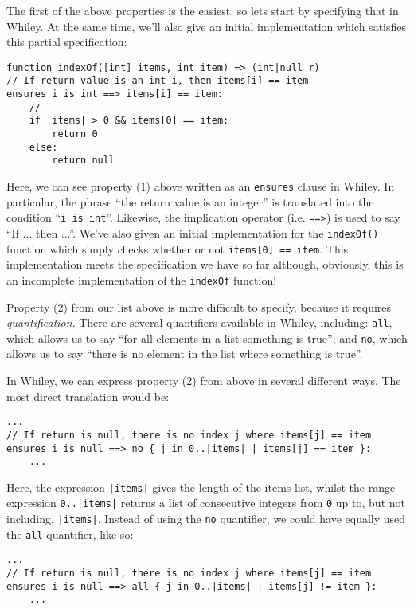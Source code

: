 The first of the above properties is the easiest, so lets start by
specifying that in Whiley.  At the same time, we'll also give an
initial implementation which satisfies this partial specification:

\begin{lstlisting}
function indexOf([int] items, int item) => (int|null r)
// If return value is an int i, then items[i] == item
ensures i is int ==> items[i] == item:
    //
    if |items| > 0 && items[0] == item:
        return 0
    else:
        return null
\end{lstlisting}

Here, we can see property (1) above written as an \lstinline{ensures}
clause in Whiley.  In particular, the phrase ``the return value is an
integer'' is translated into the condition ``\lstinline{i is int}''.
Likewise, the implication operator (i.e. \lstinline{==>}) is used to
say ``If ... then ...''.  We've also given an initial implementation
for the \lstinline{indexOf()} function which simply checks whether or
not \lstinline{items[0] == item}.  This implementation meets the
specification we have so far although, obviously, this is an
incomplete implementation of the \lstinline{indexOf} function!

Property (2) from our list above is more difficult to specify, because
it requires {\em quantification}.  There are several quantifiers
available in Whiley, including: \lstinline{all}, which allows us to
say ``for all elements in a list something is true''; and
\lstinline{no}, which allows us to say ``there is no element in the list
where something is true''. 

In Whiley, we can express property (2) from above in several different
ways.  The most direct translation would be:

\begin{lstlisting}
...
// If return is null, there is no index j where items[j] == item
ensures i is null ==> no { j in 0..|items| | items[j] == item }:
    ...
\end{lstlisting}

\noindent Here, the expression \lstinline{|items|} gives the length of
the items list, whilst the range expression \lstinline{0..|items|}
returns a list of consecutive integers from \lstinline{0} up to, but
not including, \lstinline{|items|}.  Instead of using the
\lstinline{no} quantifier, we could have equally used the
\lstinline{all} quantifier, like so:

\begin{lstlisting}
...
// If return is null, there is no index j where items[j] == item
ensures i is null ==> all { j in 0..|items| | items[j] != item }:
    ...
\end{lstlisting}

